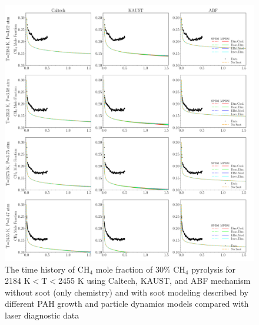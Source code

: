 \begin{figure}[H]
	\centering
	\includegraphics[width=1\textwidth]{Figures/Results/Shocktube/Stanford/june/30CH4_CH4_mechs_s1.pdf}
	\caption{The time history of $\mathrm{CH_4}$ mole fraction of 30\% $\mathrm{CH_4}$ pyrolysis for 2184 K$<\mathrm{T}<$2455 K using Caltech, KAUST, and ABF mechanism without soot (only chemistry) and with soot modeling described by different PAH growth and particle dynamics models compared with laser diagnostic data}
	\label{fig:shocktubest_30ch4_ch4_1} 
\end{figure}


